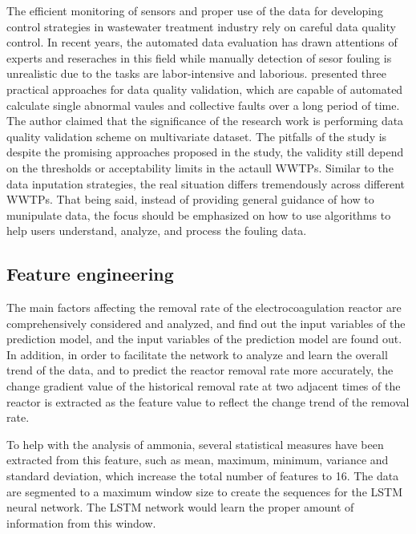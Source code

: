 The efficient monitoring of sensors and proper use of the data for developing control strategies in wastewater treatment industry rely on careful data quality control. In recent years, the automated data evaluation has drawn attentions of experts and reseraches in this field while manually detection of sesor fouling is unrealistic due to the tasks are labor-intensive and laborious. \citet{alferesValidatingDataQuality2013} presented three practical approaches for data quality validation, which are capable of automated calculate single abnormal vaules and collective faults over a long period of time. The author claimed that the significance of the research work is performing data quality validation scheme on multivariate dataset. The pitfalls of the study is despite the promising approaches proposed in the study, the validity still depend on the thresholds or acceptability limits in the actaull WWTPs. Similar to the data inputation strategies, the real situation differs tremendously across different WWTPs. That being said, instead of providing general guidance of how to munipulate data, the focus should be emphasized on how to use algorithms to help users understand, analyze, and process the fouling data.

\subsection{Feature engineering}
The main factors affecting the removal rate of the electrocoagulation reactor are comprehensively considered and analyzed, and find out the input variables of the prediction model, and the input variables of the prediction model are found out. In addition, in order to facilitate the network to analyze and learn the overall trend of the data, and to predict the reactor removal rate more accurately, the change gradient value of the historical removal rate at two adjacent times of the reactor is extracted as the feature value to reflect the change trend of the removal rate. \citep{zaghloulDevelopmentEnsembleMachine2021}

To help with the analysis of ammonia, several statistical measures have been extracted from this feature, such as mean, maximum, minimum, variance and standard deviation, which increase the total number of features to 16. The data are segmented to a maximum window size to create the sequences for the LSTM neural network. The LSTM network would learn the proper amount of information from this window. \citep{mamandipoorMonitoringDetectingFaults2020}